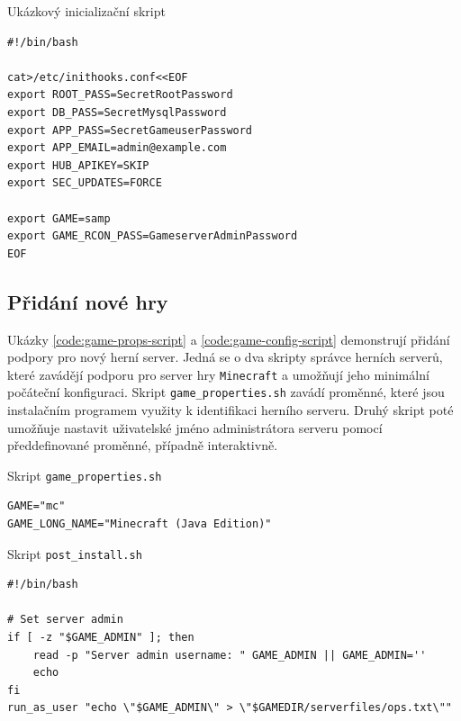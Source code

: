 \begin{listing}[h!]
    \caption{Ukázkový inicializační skript}
    \label{code:init-script}
    \begin{verbatim}
#!/bin/bash

cat>/etc/inithooks.conf<<EOF
export ROOT_PASS=SecretRootPassword
export DB_PASS=SecretMysqlPassword
export APP_PASS=SecretGameuserPassword
export APP_EMAIL=admin@example.com
export HUB_APIKEY=SKIP
export SEC_UPDATES=FORCE

export GAME=samp
export GAME_RCON_PASS=GameserverAdminPassword
EOF
    \end{verbatim}
\end{listing}

\subsection{Přidání nové hry}

Ukázky \ref{code:game-props-script} a \ref{code:game-config-script} demonstrují přidání podpory pro nový herní server. Jedná se o dva skripty správce herních serverů,
které zavádějí podporu pro server hry \texttt{Minecraft} a umožňují jeho minimální počáteční konfiguraci.
Skript \texttt{game_properties.sh} zavádí proměnné, které jsou instalačním programem využity k identifikaci herního serveru.
Druhý skript poté umožňuje nastavit uživatelské jméno administrátora serveru pomocí předdefinované proměnné, případně interaktivně.

\begin{listing}[h]
    \caption{Skript \texttt{game_properties.sh}}
    \label{code:game-props-script}
    \begin{verbatim}
GAME="mc"
GAME_LONG_NAME="Minecraft (Java Edition)"
    \end{verbatim}
\end{listing}

\begin{listing}[h]
    \caption{Skript \texttt{post_install.sh}}
    \label{code:game-config-script}
    \begin{verbatim}
#!/bin/bash

# Set server admin
if [ -z "$GAME_ADMIN" ]; then
    read -p "Server admin username: " GAME_ADMIN || GAME_ADMIN=''
    echo
fi
run_as_user "echo \"$GAME_ADMIN\" > \"$GAMEDIR/serverfiles/ops.txt\""
    \end{verbatim}
\end{listing}
